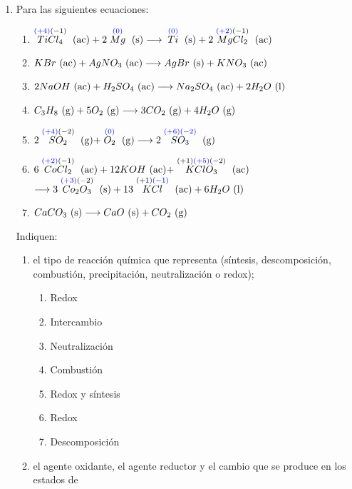 \documentclass[../practica.root.tex]{subfiles}
\begin{document}
\begin{enumerate}
    \item Para las siguientes ecuaciones: \\
          \begin{enumerate}
              \item $\stackrel{\textcolor{blue}{(+4)}(-1)}{TiCl_4} \ \text{(ac)} + 2 \stackrel{\textcolor{blue}{(0)}}{Mg} \ \text{(s)} \longrightarrow{} \stackrel{\textcolor{blue}{(0)}}{Ti} \ \text{(s)} + 2 \stackrel{\textcolor{blue}{(+2)}(-1)}{MgCl_2} \ \text{(ac)}$
              \item $KBr \ \text{(ac)} + AgNO_3 \ \text{(ac)} \longrightarrow{} AgBr \ \text{(s)} + KNO_3 \ \text{(ac)}$
              \item $2 NaOH \ \text{(ac)} + H_2SO_4 \ \text{(ac)} \longrightarrow{} Na_2SO_4 \ \text{(ac)} + 2 H_2O \ \text{(l)}$
              \item $C_3H_8 \ \text{(g)} + 5 O_2 \ \text{(g)} \longrightarrow{} 3 CO_2 \ \text{(g)} + 4 H_2O \ \text{(g)}$
              \item $2 \stackrel{\textcolor{blue}{(+4)}(-2)}{SO_2} \ \text{(g)} + \stackrel{\textcolor{blue}{(0)}}{O_2} \ \text{(g)} \longrightarrow{} 2 \stackrel{\textcolor{blue}{(+6)(-2)}}{SO_3} \ \text{(g)}$
              \item $6 \stackrel{\textcolor{blue}{(+2)}(-1)}{CoCl_2} \ \text{(ac)} + 12 KOH \ \text{(ac)} + \stackrel{(+1)\textcolor{blue}{(+5)}(-2)}{KClO_3} \ \text{(ac)}$
                    $\longrightarrow{} 3 \stackrel{\textcolor{blue}{(+3)}(-2)}{Co_2O_3} \ \text{(s)} + 13 \stackrel{(+1)\textcolor{blue}{(-1)}}{KCl} \ \text{(ac)} + 6 H_2O \ \text{(l)}$
              \item $CaCO_3 \ \text{(s)} \longrightarrow{} CaO \ \text{(s)} + CO_2 \ \text{(g)}$
          \end{enumerate}
          Indiquen:
          \begin{enumerate}
              \item el tipo de reacción química que representa (síntesis, descomposición, combustión,
                    precipitación, neutralización o redox);
                    \begin{enumerate}[label=\alph*)]
                        \item Redox
                        \item Intercambio
                        \item Neutralización
                        \item Combustión
                        \item Redox y síntesis
                        \item Redox
                        \item Descomposición
                    \end{enumerate}
              \item el agente oxidante, el agente reductor y el cambio que se produce en los estados de

\end{enumerate}
\end{enumerate}
\end{document}
